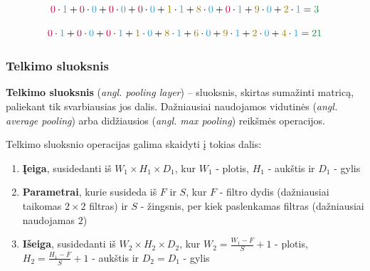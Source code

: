 \documentclass{VUMIFPSbakalaurinis}
\begin{document}
\begin{equation}\label{eq:convl1}
\textcolor{myred}{0} \cdot \textcolor{myblue}{1}+\textcolor{myred}{0} \cdot \textcolor{myblue}{0}+\textcolor{myred}{0} \cdot \textcolor{myblue}{0}+\textcolor{myred}{0} \cdot \textcolor{myblue}{0}+\textcolor{myyellow}{1} \cdot \textcolor{myblue}{1}+\textcolor{myyellow}{8} \cdot \textcolor{myblue}{0}+\textcolor{myred}{0} \cdot \textcolor{myblue}{1}+\textcolor{myyellow}{9} \cdot \textcolor{myblue}{0}+\textcolor{myyellow}{2} \cdot \textcolor{myblue}{1}=\textcolor{mygreen}{3}
\end{equation}


\begin{equation}\label{eq:convl2}
\textcolor{myred}{0} \cdot \textcolor{myblue}{1}+\textcolor{myred}{0} \cdot \textcolor{myblue}{0}+\textcolor{myred}{0} \cdot \textcolor{myblue}{1}+\textcolor{myyellow}{1} \cdot \textcolor{myblue}{0}+\textcolor{myyellow}{8} \cdot \textcolor{myblue}{1}+\textcolor{myyellow}{6} \cdot \textcolor{myblue}{0}+\textcolor{myyellow}{9} \cdot \textcolor{myblue}{1}+\textcolor{myyellow}{2} \cdot \textcolor{myblue}{0}+\textcolor{myyellow}{4} \cdot \textcolor{myblue}{1}=\textcolor{mygreen}{21}
\end{equation}

\subsubsection{Telkimo sluoksnis}

\textbf{Telkimo sluoksnis} (\textit{angl. pooling layer}) – sluoksnis, skirtas sumažinti matricą, paliekant tik svarbiausias jos dalis. Dažniausiai naudojamos vidutinės (\textit{angl. average pooling}) arba didžiausios (\textit{angl. max pooling}) reikšmės operacijos. 

Telkimo sluoksnio operacijas galima skaidyti į tokias dalis:

\begin{enumerate}
	\item \textbf{Įeiga}, susidedanti iš $ W_1 \times H_1 \times D_1 $, kur $ W_1 $ - plotis, $ H_1 $ - aukštis ir $ D_1 $ - gylis
	\item \textbf{Parametrai}, kurie susideda iš $ F $ ir $ S $, kur $ F $ - filtro dydis (dažniausiai taikomas $ 2 \times 2 $ filtras) ir $ S $ - žingsnis, per kiek paslenkamas filtras (dažniausiai naudojamas $ 2 $)
	\item \textbf{Išeiga}, susidedanti iš $ W_2 \times H_2 \times D_2 $, kur $ W_2 = \frac{W_1 - F}{S} + 1 $ - plotis, $ H_2 = \frac{H_1 - F}{S} + 1 $ - aukštis ir $ D_2 = D_1 $ - gylis
\end{enumerate}
\end{document}
